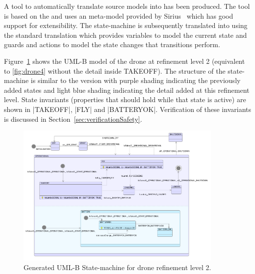 A tool to automatically translate \SCXML source models into \UMLB has been produced. 
The tool is based on the \EMF and uses an \SCXML meta-model provided by Sirius~\cite{siriuswebsite} which has good support for extensibility. 
The \UMLB state-machine is subsequently translated into \EVENTB using the standard \UMLB translation which provides variables to model the current state and guards and actions to model the state changes that transitions perform.

Figure~\ref{fig:drone2UMLB} shows the UML-B model of the drone at refinement level 2 (equivalent to \ref{fig:drone4} without the detail inside TAKEOFF).
The structure of the state-machine is similar to the \SCXML version with purple shading indicating the previously added states and light blue shading indicating the detail added at this refinement level.
State invariants (properties that should hold while that state is active) are shown in |TAKEOFF|, |FLY| and |BATTERYOK|.
Verification of these invariants is discussed in Section~\ref{sec:verificationSafety}.

\begin{figure}[]
	\centering
	\includegraphics[width=0.90\textwidth, trim=0 40 0 0]{figures/drone2UMLB.png}
	\caption{Generated UML-B State-machine for drone refinement level 2. }
	\label{fig:drone2UMLB}
\end{figure} 

